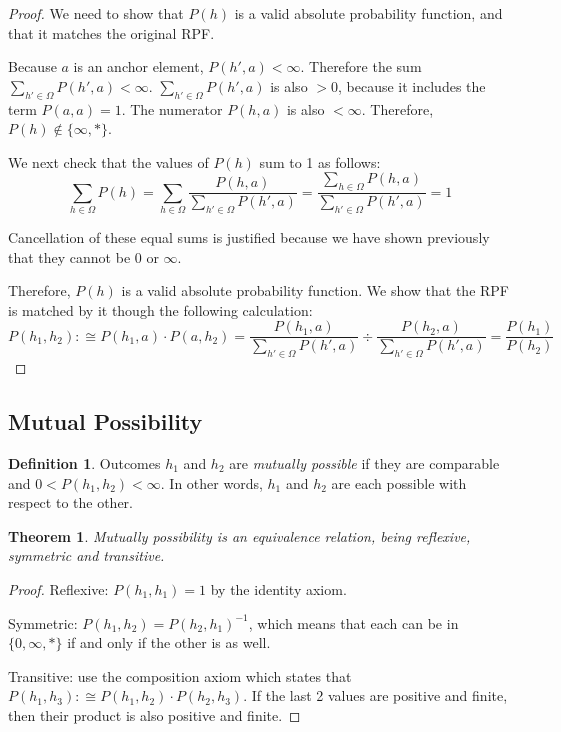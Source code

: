 \documentclass[twoside]{article}
\theoremstyle{plain}%
\newtheorem{theorem}{Theorem}[section]
\theoremstyle{definition}
\newtheorem{definition}{Definition}[section]
\theoremstyle{remark}
\begin{document}
\begin{proof}
We need to show that \(P(h)\) is a valid absolute probability function, and that it matches the original RPF.

Because \(a\) is an anchor element, \(P(h', a) < \infty\). Therefore the sum \(\sum_{h' \in \Omega}P(h', a) < \infty\). \(\sum_{h' \in \Omega}P(h', a)\) is also \(>0\), because it includes the term \(P(a, a) = 1\). The numerator \(P(h, a)\) is also \(< \infty\). Therefore, \(P(h) \notin \{\infty, \ast\}\).

We next check that the values of \(P(h)\) sum to 1 as follows:
\[\sum_{h \in \Omega}P(h) = \sum_{h \in \Omega} \frac{P(h, a)}{\sum_{h' \in \Omega}P(h', a)} = \frac{\sum_{h \in \Omega}P(h, a)}{\sum_{h' \in \Omega}P(h', a)} = 1\]

Cancellation of these equal sums is justified because we have shown previously that they cannot be \(0\) or \(\infty\).

Therefore, \(P(h)\) is a valid absolute probability function. We show that the RPF is matched by it though the following calculation:
\begin{equation}
P(h_1, h_2) :\cong P(h_1, a) \cdot P(a, h_2) = \frac{P(h_1, a)}{\sum_{h' \in \Omega}P(h', a)} \div \frac{P(h_2, a)}{\sum_{h' \in \Omega}P(h', a)} = \frac{P(h_1)}{P(h_2)}
\end{equation}
\end{proof}

\subsection{Mutual Possibility}

\begin{definition}
Outcomes \(h_1\) and \(h_2\) are \textit{mutually possible} if they are comparable and \(0 < P(h_1, h_2) < \infty\). In other words, \(h_1\) and \(h_2\) are each possible with respect to the other.
\end{definition}

\begin{theorem}
Mutually possibility is an \textit{equivalence relation}, being reflexive, symmetric and transitive.
\end{theorem}

\begin{proof}

Reflexive: \(P(h_1, h_1) = 1\) by the identity axiom.

Symmetric: \(P(h_1, h_2) = P(h_2, h_1)^{-1}\), which means that each can be in \(\{0, \infty, \ast\}\) if and only if the other is as well.

Transitive: use the composition axiom which states that \(P(h_1, h_3) :\cong P(h_1, h_2) \cdot P(h_2, h_3)\). If the last 2 values are positive and finite, then their product is also positive and finite.
\end{proof}
\end{document}
